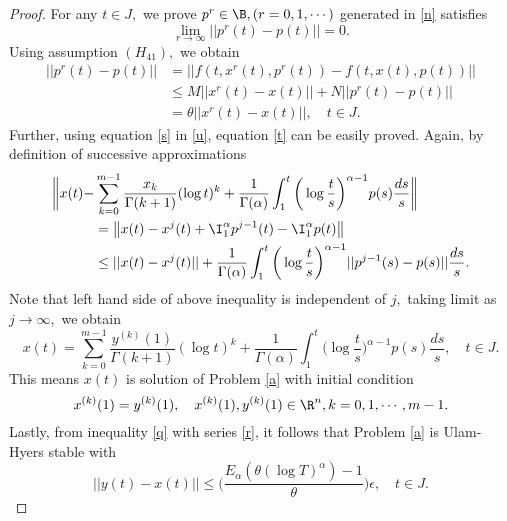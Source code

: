 \begin{proof}
For any $t\in{J},$ we prove $p^r\in\B,(r=0,1,\cdots)$ generated in \eqref{n} satisfies
\begin{equation}\label{t}
\lim_{r\to\infty}||p^r(t)-p(t)||=0.
\end{equation}
Using assumption $(H_{41}),$ we obtain
\begin{align}\label{u}
||p^r(t)-p(t)||&=||f(t,x^r(t),p^r(t))-f(t,x(t),p(t))||\nonumber\\
&\leq M||x^r(t)-x(t)||+N||p^r(t)-p(t)||\nonumber\\
&=\theta||x^r(t)-x(t)||,\quad t\in{J}.
\end{align}
Further, using equation \eqref{s} in \eqref{u}, equation \eqref{t} can be easily proved. Again, by definition of successive approximations
\begin{align*}
\bigg{\|}x(t)-&\sum_{k=0}^{m-1}\frac{x_k}{\Gamma(k+1)}(\log{t})^k+\frac{1}{\Gamma(\alpha)}\int_{1}^{t}\bigg(\log{\frac{t}{s}}\bigg)^{\alpha-1}p(s)\frac{ds}{s}\bigg{\|}\\
&=\big{\|}x(t)-x^j(t)+{\I_{1}^{\alpha}}p^{j-1}(t)-{\I_{1}^{\alpha}}p(t)\big{\|}\\
&\leq||x(t)-x^j(t)||+\frac{1}{\Gamma(\alpha)}\int_{1}^{t}\bigg(\log{\frac{t}{s}}\bigg)^{\alpha-1}||p^{j-1}(s)-p(s)||\frac{ds}{s}.
\end{align*}
Note that left hand side of above inequality is independent of $j,$ taking limit as $j\to\infty,$ we obtain
\begin{equation}\label{v}
x(t)=\sum_{k=0}^{m-1}\frac{y^{(k)}(1)}{\Gamma(k+1)}(\log{t})^k+\frac{1}{\Gamma(\alpha)}\int_{1}^{t}\bigg(\log{\frac{t}{s}}\bigg)^{\alpha-1}p(s)\frac{ds}{s},\quad t\in{J}.
\end{equation}
This means $x(t)$ is solution of Problem \eqref{a} with initial condition
\begin{equation*}
x^{(k)}(1)=y^{(k)}(1),\quad x^{(k)}(1),y^{(k)}(1)\in{\R}^{n},k=0,1,\cdots,m-1.
\end{equation*}
Lastly, from inequality \eqref{q} with series \eqref{r}, it follows that Problem \eqref{a} is Ulam-Hyers stable with
\begin{equation}\label{guh}
||y(t)-x(t)||\leq\bigg(\frac{E_\alpha(\theta(\log{T})^{\alpha})-1}{\theta}\bigg)\epsilon,\quad t\in{J}.
\end{equation}


\end{proof}
